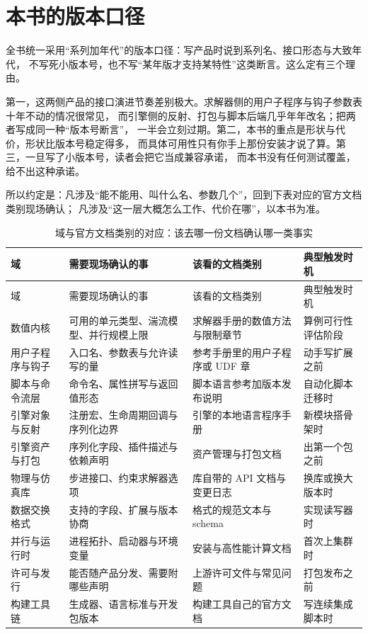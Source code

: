 \documentclass[12pt,a4paper,fontset=fandol]{ctexbook}
\begin{document}
\section{本书的版本口径}

全书统一采用``系列加年代''的版本口径：写产品时说到系列名、接口形态与大致年代，
不写死小版本号，也不写``某年版才支持某特性''这类断言。这么定有三个理由。

第一，这两侧产品的接口演进节奏差别极大。求解器侧的用户子程序与钩子参数表十年不动的情况很常见，
而引擎侧的反射、打包与脚本后端几乎年年改名；把两者写成同一种``版本号断言''，
一半会立刻过期。第二，本书的重点是形状与代价，形状比版本号稳定得多，
而具体可用性只有你手上那份安装才说了算。第三，一旦写了小版本号，读者会把它当成兼容承诺，
而本书没有任何测试覆盖，给不出这种承诺。

所以约定是：凡涉及``能不能用、叫什么名、参数几个''，回到下表对应的官方文档类别现场确认；
凡涉及``这一层大概怎么工作、代价在哪''，以本书为准。

\scriptsize
\begin{longtable}{>{\raggedright\arraybackslash}p{}>{\raggedright\arraybackslash}p{}>{\raggedright\arraybackslash}p{}>{\raggedright\arraybackslash}p{}}
\caption{域与官方文档类别的对应：该去哪一份文档确认哪一类事实}\label{tab:apC-docmap}\\
\toprule
域 & 需要现场确认的事 & 该看的文档类别 & 典型触发时机 \\
\midrule
\endfirsthead
\toprule
域 & 需要现场确认的事 & 该看的文档类别 & 典型触发时机 \\
\midrule
\endhead
\endfoot
\bottomrule
\endlastfoot
数值内核 & 可用的单元类型、湍流模型、并行规模上限 & 求解器手册的数值方法与限制章节 & 算例可行性评估阶段 \\
用户子程序与钩子 & 入口名、参数表与允许读写的量 & 参考手册里的用户子程序或 UDF 章 & 动手写扩展之前 \\
脚本与命令流层 & 命令名、属性拼写与返回值形态 & 脚本语言参考加版本发布说明 & 自动化脚本迁移时 \\
引擎对象与反射 & 注册宏、生命周期回调与序列化边界 & 引擎的本地语言程序手册 & 新模块搭骨架时 \\
引擎资产与打包 & 序列化字段、插件描述与依赖声明 & 资产管理与打包文档 & 出第一个包之前 \\
物理与仿真库 & 步进接口、约束求解器选项 & 库自带的 API 文档与变更日志 & 换库或换大版本时 \\
数据交换格式 & 支持的字段、扩展与版本协商 & 格式的规范文本与 schema & 实现读写器时 \\
并行与运行时 & 进程拓扑、启动器与环境变量 & 安装与高性能计算文档 & 首次上集群时 \\
许可与发行 & 能否随产品分发、需要附哪些声明 & 上游许可文件与常见问题 & 打包发布之前 \\
构建工具链 & 生成器、语言标准与开发包版本 & 构建工具自己的官方文档 & 写连续集成脚本时 \\
\end{longtable}
\normalsize
\end{document}

